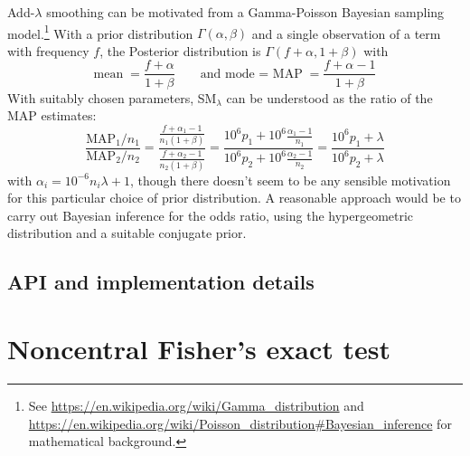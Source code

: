 \documentclass[a4paper]{article}
\begin{document}
Add-$\lambda$ smoothing can be motivated from a Gamma-Poisson Bayesian sampling model.\footnote{See \url{https://en.wikipedia.org/wiki/Gamma_distribution} and \url{https://en.wikipedia.org/wiki/Poisson_distribution\#Bayesian_inference} for mathematical background.}  With a prior distribution $\Gamma(\alpha, \beta)$ and a single observation of a term with frequency $f$, the Posterior distribution is $\Gamma(f + \alpha, 1 + \beta)$ with
\[
  \text{mean}\; = \frac{f + \alpha}{1 + \beta} \qquad
  \text{and mode = MAP}\; = \frac{f + \alpha - 1}{1 + \beta}
\]
With suitably chosen parameters, SM$_{\lambda}$ can be understood as the ratio of the MAP estimates:
\[
  \frac{\text{MAP}_1 / n_1}{\text{MAP}_2 / n_2} =
  \frac{
    \frac{f + \alpha_1 - 1}{n_1(1 + \beta)}
  }{
    \frac{f + \alpha_2 - 1}{n_2(1 + \beta)}
  } =
  \frac{
    10^6 p_1 + 10^6 \frac{\alpha_1 - 1}{n_1}
  }{
    10^6 p_2 + 10^6 \frac{\alpha_2 - 1}{n_2}
  } =
  \frac{10^6 p_1 + \lambda}{10^6 p_2 + \lambda}
\]
with $\alpha_i = 10^{-6} n_i \lambda + 1$, though there doesn't seem to be any sensible motivation for this particular choice of prior distribution.  A reasonable approach would be to carry out Bayesian inference for the odds ratio, using the hypergeometric distribution and a suitable conjugate prior.

\subsection{API and implementation details}
\label{sec:key:api}



\section{Noncentral Fisher's exact test}
\label{sec:fisher}

\end{document}
